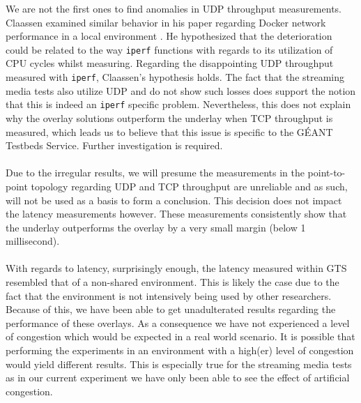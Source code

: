 We are not the first ones to find anomalies in UDP throughput measurements. Claassen examined similar behavior in his paper regarding Docker network performance in a local environment \cite{jorisclaassen2015}. He hypothesized that the deterioration could be related to the way \texttt{iperf} functions with regards to its utilization of CPU cycles whilst measuring. Regarding the disappointing UDP throughput measured with \texttt{iperf}, Claassen's hypothesis holds. The fact that the streaming media tests also utilize UDP and do not show such losses does support the notion that this is indeed an \texttt{iperf} specific problem. Nevertheless, this does not explain why the overlay solutions outperform the underlay when TCP throughput is measured, which leads us to believe that this issue is specific to the GÉANT Testbeds Service. Further investigation is required.
\\\\
Due to the irregular results, we will presume the measurements in the point-to-point topology regarding UDP and TCP throughput are unreliable and as such, will not be used as a basis to form a conclusion. This decision does not impact the latency measurements however. These measurements consistently show that the underlay outperforms the overlay by a very small margin (below 1 millisecond). 
\\\\
With regards to latency, surprisingly enough, the latency measured within GTS resembled that of a non-shared environment. This is likely the case due to the fact that the environment is not intensively being used by other researchers. Because of this, we have been able to get unadulterated results regarding the performance of these overlays. As a consequence we have not experienced a level of congestion which would be expected in a real world scenario. It is possible that performing the experiments in an environment with a high(er) level of congestion would yield different results. This is especially true for the streaming media tests as in our current experiment we have only been able to see the effect of artificial congestion. 
\\\\
